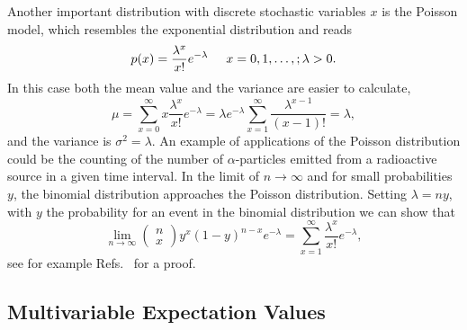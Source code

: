 Another important distribution with discrete stochastic variables $x$ is  
the Poisson model, which resembles the exponential distribution and reads
\[
    p(x) = \frac{\lambda^x}{x!} e^{-\lambda} \hspace{0.5cm}x=0,1,\dots,;\lambda > 0.
\]
In this case both the mean value and the variance are easier to calculate,
\[
\mu = \sum_{x=0}^{\infty} x \frac{\lambda^x}{x!} e^{-\lambda} = \lambda e^{-\lambda}\sum_{x=1}^{\infty}
\frac{\lambda^{x-1}}{(x-1)!}=\lambda,
\]
and the variance is $\sigma^2=\lambda$. An example of applications of the Poisson distribution could be the counting
of the number of $\alpha$-particles emitted from a radioactive source in a given time interval.
In the limit of $n\rightarrow \infty$ and for small probabilities $y$, the binomial distribution
approaches the Poisson distribution. Setting $\lambda = ny$, with $y$ the probability for an event in
the binomial distribution we can show that
\[ 
\lim_{n\rightarrow \infty}\left(\begin{array}{c} n \\ x\end{array}\right)y^x(1-y)^{n-x} e^{-\lambda}=\sum_{x=1}^{\infty}\frac{\lambda^x}{x!} e^{-\lambda},
\]
see for example Refs.~\cite{robertcasella,johnson} for a proof.\newline


\subsection{Multivariable Expectation Values}

